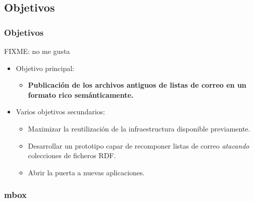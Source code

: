 \documentclass[spanish,notes=hide]{beamer}
\begin{document}
\subsection{Objetivos}
\frame
{
  \frametitle{Objetivos}
  FIXME: no me gusta
  \begin{itemize}
   \item<1-> Objetivo principal: 
     \begin{itemize}
      \item \textbf{Publicación de los archivos antiguos de listas de correo en un formato rico semánticamente.}
     \end{itemize}
   \item<2-> Varios objetivos secundarios:
	\begin{itemize}
	  \item Maximizar la reutilización de la infraestructura disponible previamente.
	  \item Desarrollar un prototipo capar de recomponer listas de correo \textit{atacando} 
		colecciones de ficheros RDF.
	  \item Abrir la puerta a nuevas aplicaciones.
     	\end{itemize}
  \end{itemize}
}
\frame
{
\frametitle{mbox}

\begin{center}
  \MBOX
\end{center}
}
\end{document}
